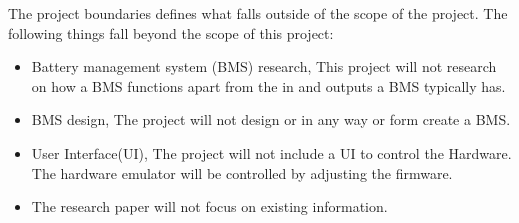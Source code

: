 The project boundaries defines what falls outside of the scope of the project.
The following things fall beyond the scope of this project:
\begin{itemize}
    \item Battery management system (BMS) research, This project will not research on how a BMS functions apart from the in and outputs a BMS typically has.
    \item BMS design, The project will not design or in any way or form create a BMS.
    \item User Interface(UI), The project will not include a UI to control the Hardware. The hardware emulator will be controlled by adjusting the firmware.
    \item The research paper will not focus on existing information.
\end{itemize}
